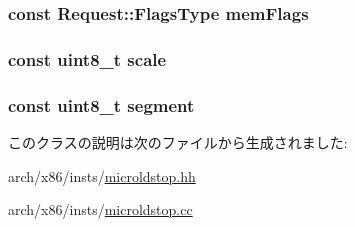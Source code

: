 \label{classX86ISA_1_1LdStOp_a28d42434456230011d33ff417d51ec7f}
\hypertarget{classX86ISA_1_1LdStOp_a7e5e9c87d0a97e7e677561e01b57ef8b}{
\subsubsection[{memFlags}]{\setlength{\rightskip}{0pt plus 5cm}const {\bf Request::FlagsType} {\bf memFlags}}}
\label{classX86ISA_1_1LdStOp_a7e5e9c87d0a97e7e677561e01b57ef8b}
\hypertarget{classX86ISA_1_1LdStOp_acc20e32e37546aa4285dbde102c6bdbe}{
\subsubsection[{scale}]{\setlength{\rightskip}{0pt plus 5cm}const uint8\_\-t {\bf scale}}}
\label{classX86ISA_1_1LdStOp_acc20e32e37546aa4285dbde102c6bdbe}
\hypertarget{classX86ISA_1_1LdStOp_aa6f211b9ff8d0fc44b861c5873f45627}{
\subsubsection[{segment}]{\setlength{\rightskip}{0pt plus 5cm}const uint8\_\-t {\bf segment}}}
\label{classX86ISA_1_1LdStOp_aa6f211b9ff8d0fc44b861c5873f45627}


このクラスの説明は次のファイルから生成されました:\begin{DoxyCompactItemize}
\item 
arch/x86/insts/\hyperlink{microldstop_8hh}{microldstop.hh}\item 
arch/x86/insts/\hyperlink{microldstop_8cc}{microldstop.cc}\end{DoxyCompactItemize}
